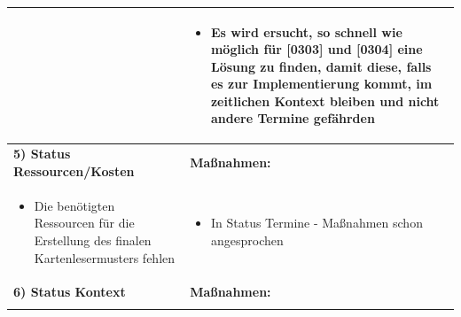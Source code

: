 \begin{center}
\begin{scriptsize}
\begin{tabularx}{\textwidth}{|p{8cm}|X|}
\begin{minipage}{.56\textwidth}
\begin{flushleft}
\begin{itemize}
         \vspace{0.2cm}
    \end{itemize}
    \end{flushleft}
    \end{minipage} &
    \begin{minipage}{.4\textwidth} 
    \begin{flushleft}
        \begin{itemize} \vspace{0cm}  
         \item Es wird ersucht, so schnell wie möglich für [0303] und [0304] eine Lösung zu finden, damit diese, falls es zur Implementierung kommt, im zeitlichen Kontext bleiben und nicht andere Termine gefährden
         \vspace{0.2cm}
    \end{itemize}
    \end{flushleft}
    \end{minipage} \\
    \hline
    \textbf{5) Status Ressourcen/Kosten} & \textbf{Maßnahmen:}\\
    \begin{minipage}{.58\textwidth} 
    \begin{flushleft}
        \begin{itemize} \vspace{0cm}  
         \item Die benötigten Ressourcen für die Erstellung des finalen Kartenlesermusters fehlen
         \vspace{0.2cm}
    \end{itemize}
    \end{flushleft}
    \end{minipage} &
    \begin{minipage}{.4\textwidth} 
    \begin{flushleft}
        \begin{itemize} %
         \item In Status Termine - Maßnahmen schon angesprochen
         \vspace{0.2cm}
    \end{itemize}
    \end{flushleft}
    \end{minipage} \\
    \hline
    \textbf{6) Status Kontext} & \textbf{Maßnahmen:}\\
    \begin{minipage}{.555\textwidth} 

\end{minipage}
\end{tabularx}
\end{scriptsize}
\end{center}

